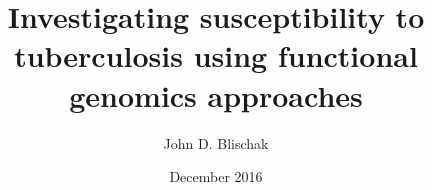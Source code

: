 \documentclass{ucetd}
\title{Investigating susceptibility to tuberculosis using functional genomics approaches}
\author{John D. Blischak}
\date{December 2016}
\begin{document}
\maketitle

\makecopyright


\tableofcontents
\listoffigures
\listoftables





\mainmatter











\makebibliography

%
%
\end{document}
